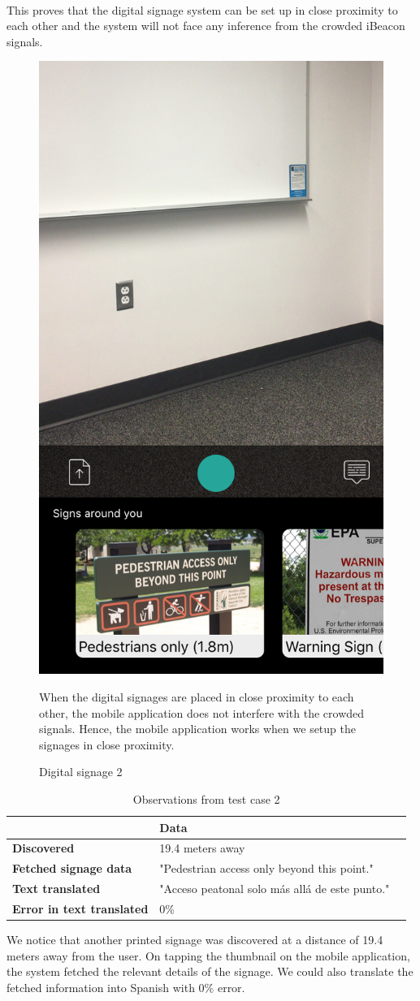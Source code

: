 \documentclass[12pt]{article}
\begin{document}
\paragraph{}This proves that the digital signage system can be set up in close proximity to each other and the system will not face any inference from the crowded iBeacon signals. 

       \begin{figure}[H]
	\centering
	\includegraphics[width=0.5\linewidth]{media/case1.png}
	\caption{Digital signage 2} {When the digital signages are placed in close proximity to each other, the mobile application does not interfere with the crowded signals. Hence, the mobile application works when we setup the signages in close proximity.}
	\label{fig:eng}
\end{figure} 

\begin{table}%
    \centering
   
    \label{my-label}
       \begin{tabular}{|p{30mm}|p{55mm}|p{35mm}|}
 \hline
  & \textbf{Data}  \\ [0.5ex] 
 \hline\hline
 \textbf{Discovered} & 19.4 meters away  \\ 
 \hline
 \textbf{Fetched signage data} & "Pedestrian access only beyond this point."  \\
 \hline
 \textbf{Text translated} &  "Acceso peatonal solo más allá de este punto." \\
 \hline
 \textbf{Error in text translated} & 0\%   \\ [1ex] 
 \hline
    \end{tabular}
     \caption{Observations from test case 2} {We notice that another printed signage was discovered at a distance of 19.4 meters away from the user. On tapping the thumbnail on the mobile application, the system fetched the relevant details of the signage. We could also translate the fetched information into Spanish with 0\% error.}
\end{table}
\end{document}
